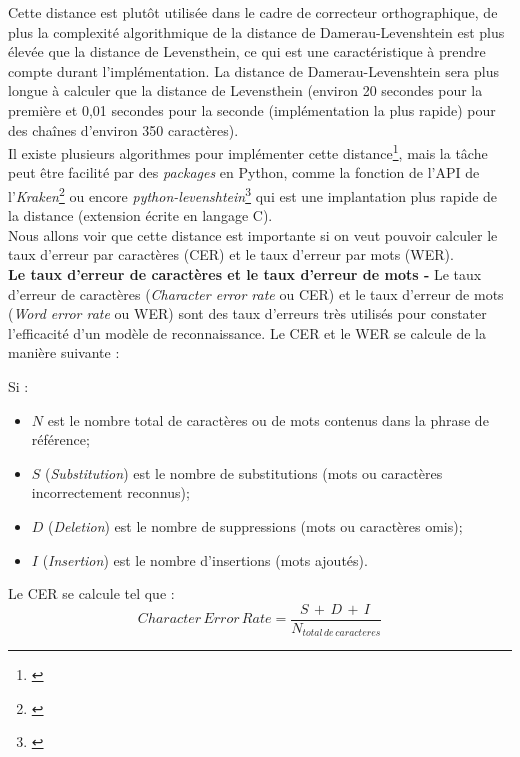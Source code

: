 Cette distance est plutôt utilisée dans le cadre de correcteur orthographique, de plus la complexité algorithmique de la distance de Damerau-Levenshtein est plus élevée que la distance de Levensthein, ce qui est une caractéristique à prendre compte durant l'implémentation. La distance de Damerau-Levenshtein sera plus longue à calculer que la distance de Levensthein (environ 20 secondes pour la première et 0,01 secondes pour la seconde (implémentation la plus rapide) pour des chaînes d'environ 350 caractères).\\

Il existe plusieurs algorithmes pour implémenter cette distance\footnote{\cite{wikibooks_algorithm_2020}}, mais la tâche peut être facilité par des \textit{packages} en Python, comme la fonction  de l'API de l'\textit{Kraken}\footnote{\cite{noauthor_kraken_nodate}} ou encore  \textit{python-levenshtein}\footnote{\cite{noauthor_python-levenshtein_nodate}} qui est une implantation plus rapide de la distance (extension écrite en langage C).\\

Nous allons voir que cette distance est importante si on veut pouvoir calculer le taux d'erreur par caractères (CER) et le taux d'erreur par mots (WER).\\ 

\textbf{Le taux d'erreur de caractères et le taux d'erreur de mots -} Le taux d'erreur de caractères (\textit{Character error rate} ou CER) et le taux d'erreur de mots (\textit{Word error rate} ou WER) sont des taux d'erreurs très utilisés pour constater l'efficacité d'un modèle de reconnaissance. Le CER et le WER se calcule de la manière suivante :

Si : 

\begin{itemize}
    \item $N$ est le nombre total de caractères ou de mots contenus dans la phrase de référence;
    \item $S$ (\textit{Substitution}) est le nombre de substitutions (mots ou caractères incorrectement reconnus);
    \item $D$ (\textit{Deletion}) est le nombre de suppressions (mots ou caractères omis);
    \item $I$ (\textit{Insertion}) est le nombre d'insertions (mots ajoutés).
\end{itemize}

Le CER se calcule tel que : $$ Character\, Error\, Rate = \frac{S\, + \,D\, + \,I\,}{N_{total\, de\, caracteres}} $$

